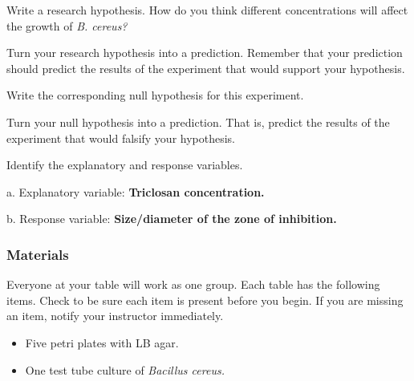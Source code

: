 \documentclass[12pt]{exam}
\begin{document}
\begin{questions}

\question \label{ques:research_hypothesis}
Write a research hypothesis. How do you think different concentrations will affect the growth of \textit{B. cereus?}

\newpage

\question
Turn your research hypothesis into a prediction. Remember that your prediction should predict the results of the experiment that would support your hypothesis. 

\vspace*{3\baselineskip}

\question \label{ques:null_hypothesis}
Write the corresponding null hypothesis for this experiment. 

\vspace*{3\baselineskip}

\question
Turn your null hypothesis into a prediction. That is, predict the results of the experiment that would falsify your hypothesis. 

\vspace*{3\baselineskip}

\question
Identify the explanatory and response variables. 

a. Explanatory variable: \ifprintanswers \textbf{Triclosan concentration.} \fi
	
	\vspace*{\baselineskip}
	
b. Response variable: \ifprintanswers \textbf{Size/diameter of the zone of inhibition.} \fi
 

\vspace*{0.5\baselineskip}

\subsubsection*{Materials}

Everyone at your table will work as one group. Each table has the following items. Check to be sure each item is present before you begin. If you are missing an item, notify your instructor immediately.

\begin{itemize}

	\item Five petri plates with LB agar.
	
	\item One test tube culture of \textit{Bacillus cereus.}
	

\end{itemize}
\end{questions}
\end{document}
